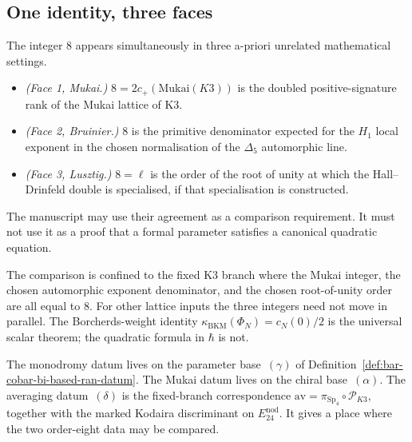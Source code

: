 \subsection{One identity, three faces}

\begin{remark}
\label{rem:trinity-of-eight}
The integer $8$ appears simultaneously in three a-priori unrelated mathematical settings.
\begin{itemize}
\item \emph{(Face 1, Mukai.)} $8 = 2c_+(\mathrm{Mukai}(K3))$ is the doubled positive-signature rank of the Mukai lattice of K3.
\item \emph{(Face 2, Bruinier.)} $8$ is the primitive denominator expected for the $H_1$ local exponent in the chosen normalisation of the $\Delta_5$ automorphic line.
\item \emph{(Face 3, Lusztig.)} $8 = \ell$ is the order of the root of unity at which the Hall--Drinfeld double is specialised, if that specialisation is constructed.
\end{itemize}
The manuscript may use their agreement as a comparison requirement. It must not use it as a proof that a formal parameter satisfies a canonical quadratic equation.
\end{remark}

\begin{remark}
\label{rem:universal-identity-scope}
The comparison is confined to the fixed K3 branch where the Mukai integer, the chosen automorphic exponent denominator, and the chosen root-of-unity order are all equal to $8$. For other lattice inputs the three integers need not move in parallel. The Borcherds-weight identity $\kappa_{\mathrm{BKM}}(\Phi_N)=c_N(0)/2$ is the universal scalar theorem; the quadratic formula in $\hbar$ is not.
\end{remark}

\begin{remark}
\label{rem:humbert-bi-based-anchor}
The monodromy datum lives on the parameter base~$(\gamma)$ of Definition~\ref{def:bar-cobar-bi-based-ran-datum}. The Mukai datum lives on the chiral base~$(\alpha)$. The averaging datum~$(\delta)$ is the fixed-branch correspondence \(\mathrm{av}=\pi_{\mathrm{Sp}_4}\circ\mathscr P_{K3}\), together with the marked Kodaira discriminant on \(E^{\mathrm{nod}}_{24}\). It gives a place where the two order-eight data may be compared.
\end{remark}

